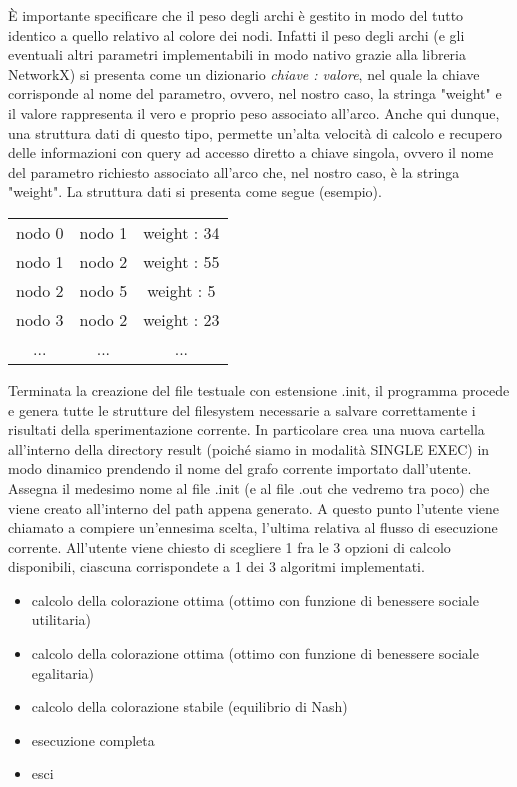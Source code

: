 È importante specificare che il peso degli archi è gestito in modo del tutto identico a quello relativo al colore dei nodi. Infatti il peso degli archi (e gli eventuali altri parametri implementabili in modo nativo grazie alla libreria NetworkX) si presenta come un dizionario \textit{chiave : valore}, nel quale la chiave corrisponde al nome del parametro, ovvero, nel nostro caso, la stringa "weight" e il valore rappresenta il vero e proprio peso associato all'arco. Anche qui dunque, una struttura dati di questo tipo, permette un'alta velocità di calcolo e recupero delle informazioni con query ad accesso diretto a chiave singola, ovvero il nome del parametro richiesto associato all'arco che, nel nostro caso, è la stringa "weight". La struttura dati si presenta come segue (esempio).

\begin{table}[H]
\centering
\begin{tabular}{ccc}
nodo 0 & nodo 1 & weight : 34 \\
nodo 1 & nodo 2 & weight : 55 \\
nodo 2 & nodo 5 & weight : 5 \\
nodo 3 & nodo 2 & weight : 23 \\
... & ... & ...
\end{tabular}
\end{table}

Terminata la creazione del file testuale con estensione .init, il programma procede e genera tutte le strutture del filesystem necessarie a salvare correttamente i risultati della sperimentazione corrente. In particolare crea una nuova cartella all'interno della directory result (poiché siamo in modalità SINGLE EXEC) in modo dinamico prendendo il nome del grafo corrente importato dall'utente. Assegna il medesimo nome al file .init (e al file .out che vedremo tra poco) che viene creato all'interno del path appena generato. A questo punto l'utente viene chiamato a compiere un'ennesima scelta, l'ultima relativa al flusso di esecuzione corrente. All'utente viene chiesto di scegliere 1 fra le 3 opzioni di calcolo disponibili, ciascuna corrispondete a 1 dei 3 algoritmi implementati.

\begin{itemize}
	\item calcolo della colorazione ottima (ottimo con funzione di benessere sociale utilitaria)
	\item calcolo della colorazione ottima (ottimo con funzione di benessere sociale egalitaria)
	\item calcolo della colorazione stabile (equilibrio di Nash)
	\item esecuzione completa
	\item esci
\end{itemize}

